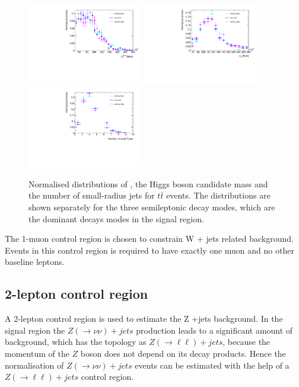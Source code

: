 \begin{figure}[h]
    \centering
	\includegraphics[width=0.45\textwidth]{chapters/c7/figures/ttbar_MetTST_met.pdf}
	\includegraphics[width=0.45\textwidth]{chapters/c7/figures/ttbar_m_jj.pdf}
	\includegraphics[width=0.45\textwidth]{chapters/c7/figures/ttbar_N_Jets04.pdf}		
	\caption{Normalised distributions of \met, the Higgs boson candidate mass and the number of small-radius jets for $t\bar{t}$ events. The distributions are shown separately for the three semileptonic decay modes, which are the dominant decays modes in the signal region.}
	\label{fig:ttbarDecayCatKinematic}
\end{figure}

\par The 1-muon control region is chosen to constrain W + jets related background. Events in this control region is required to have exactly one muon and no other baseline leptons.

\subsection{2-lepton control region}
\par A 2-lepton control region is used to estimate the Z +jets background. 
In the signal region the $Z(\to\nu\nu)+jets$ production leads to a significant amount of background, which has the topology as $Z(\to\ell\ell)+jets$, because the momentum of the $Z$ boson does not depend on its decay products. 
Hence the normalisation of $Z(\to\nu\nu)+jets$ events can be estimated with the help of a $Z(\to\ell\ell)+jets$ control region.

